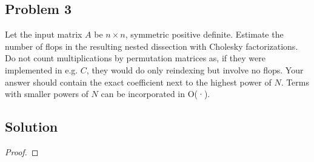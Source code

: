 \documentclass[12pt]{report}
\begin{document}
\begin{problem}%
\subsection*{Problem 3}

Let the input matrix $A$ be $n \times n$, symmetric positive definite. Estimate the number of flops in the resulting nested dissection with Cholesky factorizations. Do not count multiplications by permutation matrices as, if they were implemented in e.g. $C$, they would do only reindexing but involve no flops. Your answer should contain the exact coefficient next to the highest power of $N$. Terms with smaller powers of $N$ can be incorporated in O(·).




\subsection*{Solution}
\begin{proof}


\end{proof}
\end{problem}
\end{document}
